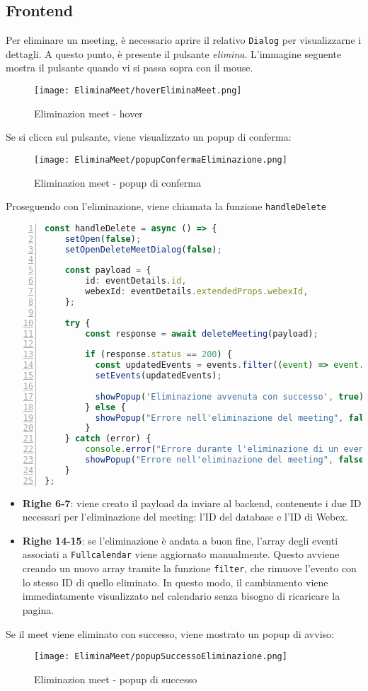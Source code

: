 \subsection{Frontend}
Per eliminare un meeting, è necessario aprire il relativo \texttt{Dialog} per visualizzarne i dettagli. 
A questo punto, è presente il pulsante \textit{elimina}. 
L'immagine seguente mostra il pulsante quando vi si passa sopra con il mouse.
\begin{figure}[H]
    \centering
    \texttt{[image: EliminaMeet/hoverEliminaMeet.png]}
    \caption{Eliminazion meet - hover}
\end{figure}
\noindent Se si clicca sul pulsante, viene visualizzato un popup di conferma:
\begin{figure}[H]
    \centering
    \texttt{[image: EliminaMeet/popupConfermaEliminazione.png]}
    \caption{Eliminazion meet - popup di conferma}
\end{figure}
\noindent Proseguendo con l'eliminazione, viene chiamata la funzione \texttt{handleDelete}
\begin{lstlisting}[language=typescript, frame=lines, basicstyle=\ttfamily\scriptsize, numbers=left]
const handleDelete = async () => {
    setOpen(false);
    setOpenDeleteMeetDialog(false);
  
    const payload = {
        id: eventDetails.id,
        webexId: eventDetails.extendedProps.webexId,
    };
  
    try {
        const response = await deleteMeeting(payload);
  
        if (response.status == 200) {
          const updatedEvents = events.filter((event) => event.id != eventDetails.id);
          setEvents(updatedEvents);
  
          showPopup('Eliminazione avvenuta con successo', true);
        } else {
          showPopup("Errore nell'eliminazione del meeting", false);
        }
    } catch (error) {
        console.error("Errore durante l'eliminazione di un evento:", error);
        showPopup("Errore nell'eliminazione del meeting", false);
    }
};
\end{lstlisting}
\begin{itemize}
    \item \textbf{Righe 6-7}:  viene creato il payload da inviare al backend, 
    contenente i due ID necessari per l'eliminazione del meeting: l'ID del database e l'ID di Webex.

    \item \textbf{Righe 14-15}: se l'eliminazione è andata a buon fine, l'array degli eventi associati a \texttt{Fullcalendar} 
    viene aggiornato manualmente. Questo avviene creando un nuovo array tramite la funzione \texttt{filter}, 
    che rimuove l'evento con lo stesso ID di quello eliminato. In questo modo, il cambiamento viene immediatamente visualizzato
    nel calendario senza bisogno di ricaricare la pagina.
\end{itemize}
Se il meet viene eliminato con successo, viene mostrato un popup di avviso:
\begin{figure}[H]
    \centering
    \texttt{[image: EliminaMeet/popupSuccessoEliminazione.png]}
    \caption{Eliminazion meet - popup di successo}
\end{figure}
